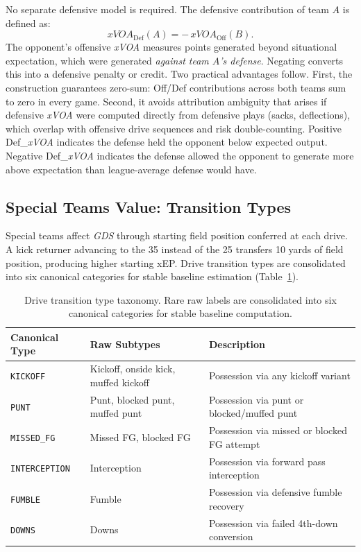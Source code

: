\documentclass[12pt,a4paper]{article}
\newcommand{\xvoa}{\textit{xVOA}}
\newcommand{\gds}{\textit{GDS}}
\begin{document}
No separate defensive model is required. The defensive contribution of team $A$ is defined as:
\begin{equation}
  \label{eq:xvoa-def}
  \xvoa{}_{\mathrm{Def}}(A) = -\,\xvoa{}_{\mathrm{Off}}(B).
\end{equation}
The opponent's offensive \xvoa{} measures points generated beyond situational expectation, which were generated \emph{against team $A$'s defense}. Negating converts this into a defensive penalty or credit. Two practical advantages follow. First, the construction guarantees zero-sum: Off/Def contributions across both teams sum to zero in every game. Second, it avoids attribution ambiguity that arises if defensive \xvoa{} were computed directly from defensive plays (sacks, deflections), which overlap with offensive drive sequences and risk double-counting. Positive Def\_\xvoa{} indicates the defense held the opponent below expected output. Negative Def\_\xvoa{} indicates the defense allowed the opponent to generate more above expectation than league-average defense would have.

\subsection{Special Teams Value: Transition Types}

Special teams affect \gds{} through starting field position conferred at each drive. A kick returner advancing to the 35 instead of the 25 transfers 10 yards of field position, producing higher starting xEP. Drive transition types are consolidated into six canonical categories for stable baseline estimation (Table~\ref{tab:transitions}).

\begin{table}[htbp]
  \centering
  \caption{Drive transition type taxonomy. Rare raw labels are consolidated into six canonical categories for stable baseline computation.}
  \label{tab:transitions}
  \small
  \begin{tabularx}{\textwidth}{l l X}
    \toprule
    \textbf{Canonical Type} & \textbf{Raw Subtypes} & \textbf{Description} \\
    \midrule
    \texttt{KICKOFF} & Kickoff, onside kick, muffed kickoff & Possession via any kickoff variant \\
    \texttt{PUNT} & Punt, blocked punt, muffed punt & Possession via punt or blocked/muffed punt \\
    \texttt{MISSED\_FG} & Missed FG, blocked FG & Possession via missed or blocked FG attempt \\
    \texttt{INTERCEPTION} & Interception & Possession via forward pass interception \\
    \texttt{FUMBLE} & Fumble & Possession via defensive fumble recovery \\
    \texttt{DOWNS} & Downs & Possession via failed 4th-down conversion \\
    \bottomrule
  \end{tabularx}
\end{table}
\end{document}
